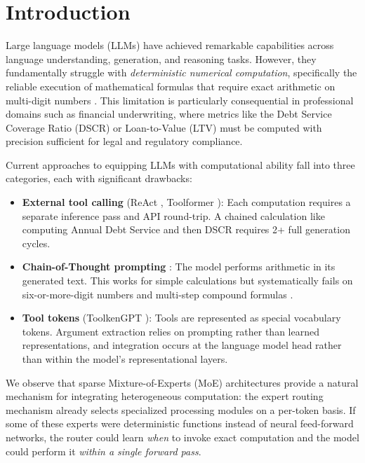 \section{Introduction}
\label{sec:intro}

Large language models (LLMs) have achieved remarkable capabilities across
language understanding, generation, and reasoning tasks. However, they
fundamentally struggle with \emph{deterministic numerical computation},
specifically the reliable execution of mathematical formulas that require exact
arithmetic on multi-digit numbers
\citep{dziri2023faith}. This limitation is
particularly consequential in professional domains such as financial
underwriting, where metrics like the Debt Service Coverage Ratio (DSCR)
or Loan-to-Value (LTV) must be computed with precision sufficient for
legal and regulatory compliance.

Current approaches to equipping LLMs with computational ability fall into
three categories, each with significant drawbacks:

\begin{itemize}
\item \textbf{External tool calling} (ReAct \citep{yao2023react},
Toolformer \citep{schick2023toolformer}): Each computation requires a
separate inference pass and API round-trip. A chained calculation like
computing Annual Debt Service and then DSCR requires 2+ full
generation cycles.
\item \textbf{Chain-of-Thought prompting} \citep{wei2022chain}: The model
performs arithmetic in its generated text. This works for simple
calculations but systematically fails on six-or-more-digit numbers
and multi-step compound formulas \citep{dziri2023faith}.
\item \textbf{Tool tokens} (ToolkenGPT \citep{hao2023toolkengpt}): Tools
are represented as special vocabulary tokens. Argument extraction
relies on prompting rather than learned representations, and
integration occurs at the language model head rather than within the
model's representational layers.
\end{itemize}

We observe that sparse Mixture-of-Experts (MoE) architectures
\citep{shazeer2017outrageously,fedus2022switch,jiang2024mixtral} provide
a natural mechanism for integrating heterogeneous computation: the expert
routing mechanism already selects specialized processing modules on a
per-token basis. If some of these experts were deterministic functions
instead of neural feed-forward networks, the router could learn
\emph{when} to invoke exact computation and the model could perform it
\emph{within a single forward pass}.


